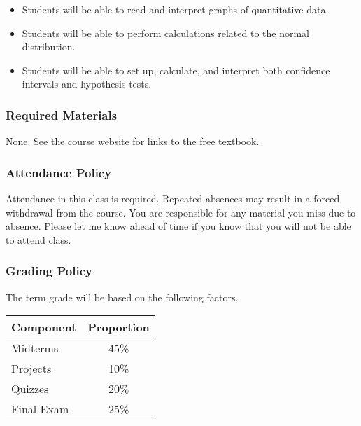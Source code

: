 \documentclass[10pt]{article}
\begin{document}
\begin{itemize}

\item Students will be able to read and interpret graphs of quantitative data.
\item Students will be able to perform calculations related to the normal distribution. 
\item Students will be able to set up, calculate, and interpret both confidence intervals and hypothesis tests.

\end{itemize}

\subsubsection*{Required Materials}

None. See the course website for links to the free textbook.

%
\subsubsection*{Attendance Policy}

Attendance in this class is required. Repeated absences may result in a forced withdrawal from the course. You are responsible for any material you miss due to absence. Please let me know ahead of time if you know that you will not be able to attend class.

\subsubsection*{Grading Policy}

The term grade will be based on the following factors.

\begin{center}
\begin{tabular}{|l|c|}
\hline
Component      & Proportion \\ \hline
Midterms  & 45\% \\
Projects  & 10\% \\
Quizzes  & 20\% \\
Final Exam  & 25\% \\ \hline
\end{tabular}
\end{center}
\end{document}
